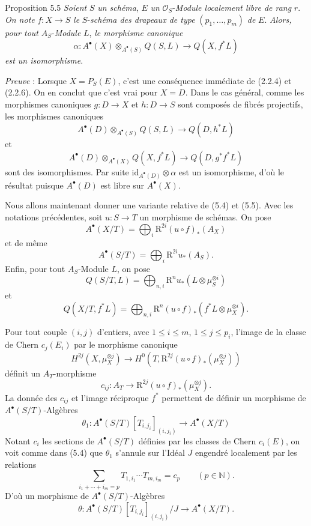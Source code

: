 \begin{statement}{Proposition 5.5}
\emph{Soient} $S$ \emph{un schéma}, $E$ \emph{un} $\mathcal{O}_S$-\emph{Module localement libre de rang} $r$. \emph{On note} $f:X\to S$ \emph{le} $S$-\emph{schéma des drapeaux de type} $(p_1,\ldots,p_m)$ \emph{de} $E$. \emph{Alors, pour tout} $A_S$-\emph{Module} $L$, \emph{le morphisme canonique}
\[
\alpha:A^\bullet(X)\otimes_{A^\bullet(S)}Q(S,L)\to Q(X,f^*L)
\]
\emph{est un isomorphisme}.
\end{statement}

\emph{Preuve} : Lorsque $X=P_S(E)$, c'est une conséquence immédiate de (2.2.4) et (2.2.6). On en conclut que c'est vrai pour $X=D$. Dans le cas général, comme les morphismes canoniques $g:D\to X$ et $h:D\to S$ sont composés de fibrés projectifs, les morphismes canoniques
\[
A^\bullet(D)\otimes_{A^\bullet(S)}Q(S,L)\to Q(D,h^*L)
\]
et
\[
A^\bullet(D)\otimes_{A^\bullet(X)}Q(X,f^*L)\to Q(D,g^*f^*L)
\]
sont des isomorphismes. Par suite $\mathrm{id}_{A^\bullet(D)}\otimes\alpha$ est un isomorphisme, d'où le résultat puisque $A^\bullet(D)$ est libre sur $A^\bullet(X)$.

Nous allons maintenant donner une variante relative de (5.4) et (5.5). Avec les notations précédentes, soit $u:S\to T$ un morphisme de schémas. On pose
\[
A^\bullet(X/T)=\bigoplus_i \mathrm{R}^{2i}(u\circ f)_*(A_X)
\]
et de même
\[
A^\bullet(S/T)=\bigoplus_i \mathrm{R}^{2i}u_*(A_S).
\]
Enfin, pour tout $A_S$-Module $L$, on pose
\[
Q(S/T,L)=\bigoplus_{n,i}\mathrm{R}^n u_*(L\otimes\mu_S^{\otimes i})
\]
et
\[
Q(X/T,f^*L)=\bigoplus_{n,i}\mathrm{R}^n(u\circ f)_*(f^*L\otimes\mu_X^{\otimes i}).
\]

Pour tout couple $(i,j)$ d'entiers, avec $1\le i\le m$, $1\le j\le p_i$, l'image de la classe de Chern $c_j(E_i)$ par le morphisme canonique
\[
H^{2j}(X,\mu_X^{\otimes j})
\to H^0(T,\mathrm{R}^{2j}(u\circ f)_*(\mu_X^{\otimes j}))
\]
définit un $A_T$-morphisme
\[
c_{ij}:A_T\to \mathrm{R}^{2j}(u\circ f)_*(\mu_X^{\otimes j}).
\]
La donnée des $c_{ij}$ et l'image réciproque $f^*$ permettent de définir un morphisme de $A^\bullet(S/T)$-Algèbres
\[
\theta_1:A^\bullet(S/T)[T_{i,j_i}]_{(i,j_i)}\to A^\bullet(X/T)
\]
Notant $c_i$ les sections de $A^\bullet(S/T)$ définies par les classes de Chern $c_i(E)$, on voit comme dans (5.4) que $\theta_1$ s'annule sur l'Idéal $J$ engendré localement par les relations
\[
\sum_{i_1+\cdots+i_m=p}T_{1,i_1}\cdots T_{m,i_m}=c_p\qquad(p\in\mathbb{N}).
\]
D'où un morphisme de $A^\bullet(S/T)$-Algèbres
\[
\theta:A^\bullet(S/T)[T_{i,j_i}]_{(i,j_i)}/J\to A^\bullet(X/T).
\]

